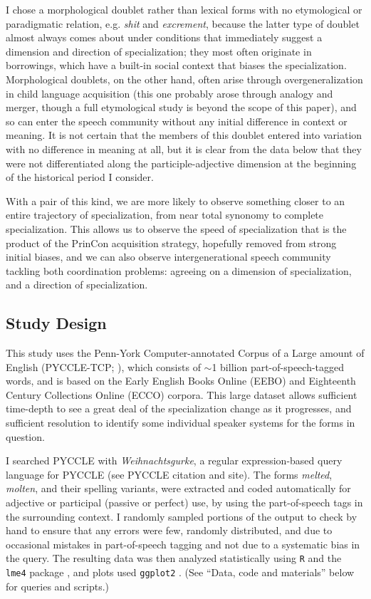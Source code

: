 \documentclass{artikel3}
\begin{document}
I chose a morphological doublet rather than lexical forms with no etymological or paradigmatic relation, e.g. \textsl{shit} and \textsl{excrement}, because the latter type of doublet almost always comes about under conditions that immediately suggest a dimension and direction of specialization; they most often originate in borrowings, which have a built-in social context that biases the specialization. Morphological doublets, on the other hand, often arise through overgeneralization in child language acquisition (this one probably arose through analogy and merger, though a full etymological study is beyond the scope of this paper), and so can enter the speech community without any initial difference in context or meaning. It is not certain that the members of this doublet entered into variation with no difference in meaning at all, but it is clear from the data below that they were not differentiated along the participle-adjective dimension at the beginning of the historical period I consider.

With a pair of this kind, we are more likely to observe something closer to an entire trajectory of specialization, from near total synonomy to complete specialization. This allows us to observe the speed of specialization that is the product of the PrinCon acquisition strategy, hopefully removed from strong initial biases, and we can also observe intergenerational speech community tackling both coordination problems: agreeing on a dimension of specialization, and a direction of specialization.

\subsection{Study Design}

This study uses the {P}enn-{Y}ork {C}omputer-annotated {C}orpus of a {L}arge amount of {E}nglish  (PYCCLE-TCP; \citealt{pyccle}), which consists of $\sim$1 billion part-of-speech-tagged words, and is based on the Early English Books Online (EEBO) and Eighteenth Century Collections Online (ECCO) corpora. This large dataset allows sufficient time-depth to see a great deal of the specialization change as it progresses, and sufficient resolution to identify some individual speaker systems for the forms in question.

I searched PYCCLE with \textsl{Weihnachtsgurke}, a regular expression-based query language for PYCCLE (see PYCCLE citation and site). The forms \textsl{melted}, \textsl{molten}, and their spelling variants, were extracted and coded automatically for adjective or participal (passive or perfect) use, by using the part-of-speech tags in the surrounding context. I randomly sampled portions of the output to check by hand to ensure that any errors were few, randomly distributed, and due to occasional mistakes in part-of-speech tagging and not due to a systematic bias in the query. The resulting data was then analyzed statistically using \texttt{R} and the \texttt{lme4} package \citep{lme4}, and plots used \texttt{ggplot2} \citep{ggplot2}. (See ``Data, code and materials'' below for queries and scripts.)
\end{document}
